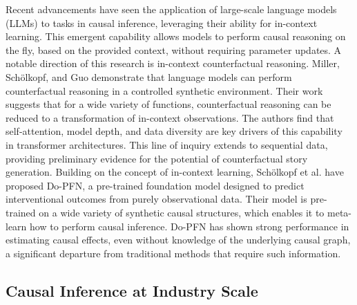 {Recent advancements have seen the application of large-scale language models (LLMs) to tasks in causal inference, leveraging their ability for in-context learning. This emergent capability allows models to perform causal reasoning on the fly, based on the provided context, without requiring parameter updates. A notable direction of this research is in-context counterfactual reasoning. Miller, Schölkopf, and Guo\cite{miller2025counterfactualreasoninganalysisincontext} demonstrate that language models can perform counterfactual reasoning in a controlled synthetic environment. Their work suggests that for a wide variety of functions, counterfactual reasoning can be reduced to a transformation of in-context observations. The authors find that self-attention, model depth, and data diversity are key drivers of this capability in transformer architectures. This line of inquiry extends to sequential data, providing preliminary evidence for the potential of counterfactual story generation. Building on the concept of in-context learning, Schölkopf et al.\cite{robertson2025dopfnincontextlearningcausal} have proposed Do-PFN, a pre-trained foundation model designed to predict interventional outcomes from purely observational data. Their model is pre-trained on a wide variety of synthetic causal structures, which enables it to meta-learn how to perform causal inference. Do-PFN has shown strong performance in estimating causal effects, even without knowledge of the underlying causal graph, a significant departure from traditional methods that require such information.


\subsection{Causal Inference at Industry Scale}

}
